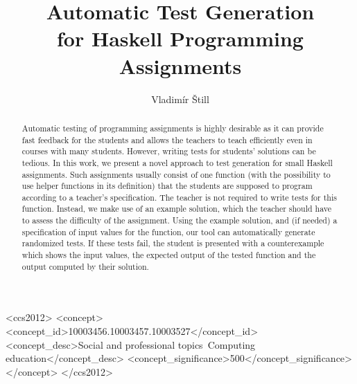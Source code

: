 \documentclass[sigconf,screen]{acmart} %
\begin{document}
\title{Automatic Test Generation\\ for Haskell Programming Assignments}

\author{Vladimír Štill}

\begin{abstract}
    Automatic testing of programming assignments is highly desirable as it can
    provide fast feedback for the students and allows the teachers to teach
    efficiently even in courses with many students.
    However, writing tests for students' solutions can be tedious.
    In this work, we present a novel approach to test generation for small Haskell
    assignments.
    Such assignments usually consist of one function (with the possibility to use
    helper functions in its definition) that the students are supposed to program
    according to a teacher's specification.
    The teacher is not required to write tests for this function.
    Instead, we make use of an example solution, which the teacher should have
    to assess the difficulty of the assignment.
    Using the example solution, and (if needed) a specification of input values for
    the function, our tool can automatically generate randomized tests.
    If these tests fail, the student is presented with a counterexample which
    shows the input values, the expected output of the tested function and the
    output computed by their solution.
\end{abstract}

\begin{CCSXML}
<ccs2012>
    <concept>
        <concept_id>10003456.10003457.10003527</concept_id>
        <concept_desc>Social and professional topics~Computing education</concept_desc>
        <concept_significance>500</concept_significance>
    </concept>
</ccs2012>
\end{CCSXML}

\end{document}
